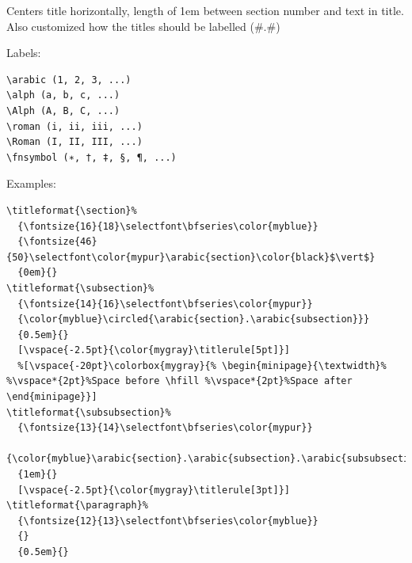 \documentclass{article}
\begin{document}
Centers title horizontally, length of 1em between section number
and text in title. Also customized how the titles should be labelled
(\#.\#)

Labels:
\begin{lstlisting}
\arabic (1, 2, 3, ...)
\alph (a, b, c, ...)
\Alph (A, B, C, ...)
\roman (i, ii, iii, ...)
\Roman (I, II, III, ...)
\fnsymbol (∗, †, ‡, §, ¶, ...)
\end{lstlisting}
Examples:
\begin{lstlisting}
\titleformat{\section}%
  {\fontsize{16}{18}\selectfont\bfseries\color{myblue}}
  {\fontsize{46}{50}\selectfont\color{mypur}\arabic{section}\color{black}$\vert$}
  {0em}{}
\titleformat{\subsection}%
  {\fontsize{14}{16}\selectfont\bfseries\color{mypur}}
  {\color{myblue}\circled{\arabic{section}.\arabic{subsection}}}
  {0.5em}{}
  [\vspace{-2.5pt}{\color{mygray}\titlerule[5pt]}]
  %[\vspace{-20pt}\colorbox{mygray}{% \begin{minipage}{\textwidth}% %\vspace*{2pt}%Space before \hfill %\vspace*{2pt}%Space after \end{minipage}}]
\titleformat{\subsubsection}%
  {\fontsize{13}{14}\selectfont\bfseries\color{mypur}}
  {\color{myblue}\arabic{section}.\arabic{subsection}.\arabic{subsubsection}}
  {1em}{}
  [\vspace{-2.5pt}{\color{mygray}\titlerule[3pt]}]
\titleformat{\paragraph}%
  {\fontsize{12}{13}\selectfont\bfseries\color{myblue}}
  {}
  {0.5em}{}
\end{lstlisting}
\end{document}
